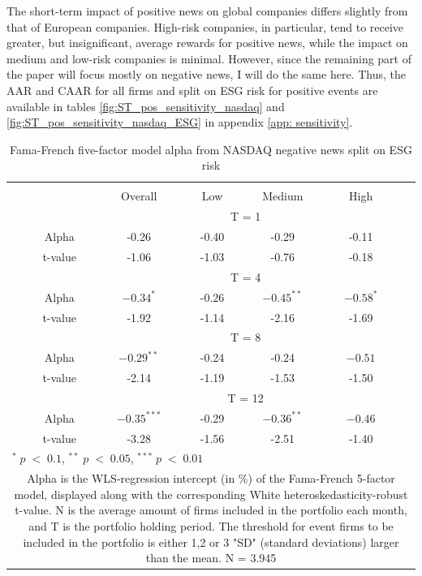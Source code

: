 The short-term impact of positive news on global companies differs slightly from that of European companies. High-risk companies, in particular, tend to receive greater, but insignificant, average rewards for positive news, while the impact on medium and low-risk companies is minimal. However, since the remaining part of the paper will focus mostly on negative news, I will do the same here. Thus, the AAR and CAAR for all firms and split on ESG risk for positive events are available in tables \ref{fig:ST_pos_sensitivity_nasdaq} and \ref{fig:ST_pos_sensitivity_nasdaq_ESG} in appendix \ref{app: sensitivity}.

\setlength{\tabcolsep}{15pt}
\begin{table}[H]
\small
\centering
\caption{Fama-French five-factor model alpha from NASDAQ negative news split on ESG risk} 
\begin{tabular}{ccccccc}
\hline \hline \\ 
 &     & Overall &    Low  &  Medium  &  High &  \\    \cline{3-6} 
& &  \multicolumn{4}{c}{ T = 1} & \\ \cline{2-6}
& Alpha  & -0.26 & -0.40  & -0.29  & -0.11 &  \\ 
& t-value   & -1.06 & -1.03 & -0.76  & -0.18 &  \\
& &  \multicolumn{4}{c}{ T = 4} & \\ \cline{2-6}
& Alpha & $-0.34^{*}$  & -0.26  & $-0.45^{**}$  &  $-0.58^{*}$ & \\
& t-value &   -1.92 & -1.14 & -2.16  & -1.69 & \\
& &  \multicolumn{4}{c}{ T = 8} & \\ \cline{2-6}
& Alpha & $-0.29^{**}$ & -0.24  & -0.24  & $-0.51$ &  \\
& t-value & -2.14 & -1.19  & -1.53 & -1.50 &  \\
& &  \multicolumn{4}{c}{ T = 12} & \\ \cline{2-6}
& Alpha  & $-0.35^{***}$ & -0.29  & $-0.36^{**}$  & $-0.46$ &  \\
& t-value & -3.28 & -1.56  & -2.51 & -1.40 &  \\
\hline \hline
 \multicolumn{7}{l}{ \footnotesize $^* \; p\; <\; 0.1$, $ ^{**} \; p\; <\; 0.05$, $ ^{***} \; p\; <\; 0.01$  } \\
 \multicolumn{7}{p{11.5cm}}{ \footnotesize Alpha is the WLS-regression intercept (in \%) of the Fama-French 5-factor model, displayed along with the corresponding White heteroskedasticity-robust t-value. N is the average amount of firms included in the portfolio each month, and T is the portfolio holding period. The threshold for event firms to be included in the portfolio is either 1,2 or 3 "SD" (standard deviations) larger than the mean. N = 3.945 } \\ 
 \hline
\end{tabular}
\label{tab: FF5_neg_nasdaq}
\end{table}

